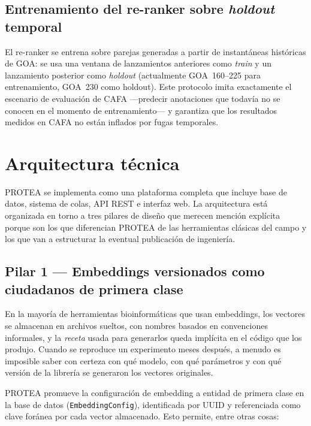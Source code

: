 \documentclass[11pt,a4paper]{article}
\begin{document}
\subsection{Entrenamiento del re-ranker sobre \emph{holdout} temporal}

El re-ranker se entrena sobre parejas generadas a partir de instantáneas
históricas de GOA: se usa una ventana de lanzamientos anteriores como
\emph{train} y un lanzamiento posterior como \emph{holdout} (actualmente
GOA~160–225 para entrenamiento, GOA~230 como holdout). Este protocolo imita
exactamente el escenario de evaluación de CAFA —predecir anotaciones que
todavía no se conocen en el momento de entrenamiento— y garantiza que los
resultados medidos en CAFA no están inflados por fugas temporales.

\section{Arquitectura técnica}

PROTEA se implementa como una plataforma completa que incluye base de datos,
sistema de colas, API REST e interfaz web. La arquitectura está organizada en
torno a tres pilares de diseño que merecen mención explícita porque son los
que diferencian PROTEA de las herramientas clásicas del campo y los que van a
estructurar la eventual publicación de ingeniería.

\subsection{Pilar 1 — Embeddings versionados como ciudadanos de primera clase}

En la mayoría de herramientas bioinformáticas que usan embeddings, los
vectores se almacenan en archivos sueltos, con nombres basados en convenciones
informales, y la \emph{receta} usada para generarlos queda implícita en el
código que los produjo. Cuando se reproduce un experimento meses después, a
menudo es imposible saber con certeza con qué modelo, con qué parámetros y con
qué versión de la librería se generaron los vectores originales.

PROTEA promueve la configuración de embedding a entidad de primera clase en la
base de datos (\texttt{EmbeddingConfig}), identificada por UUID y referenciada
como clave foránea por cada vector almacenado. Esto permite, entre otras
cosas:
\end{document}
